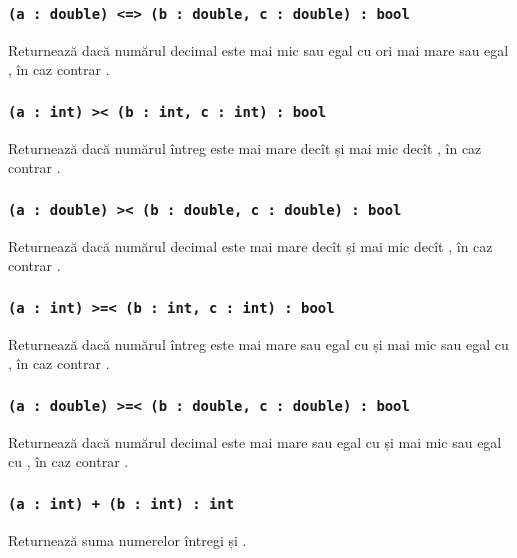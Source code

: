 \subsubsection{\lstinline|(a : double) <=> (b : double, c : double) : bool|}

Returnează \true{} dacă numărul decimal  este mai mic sau egal cu  ori mai mare sau egal , în caz contrar \false{}.

\subsubsection{\lstinline|(a : int) >< (b : int, c : int) : bool|}

Returnează \true{} dacă numărul întreg  este mai mare decît  și mai mic decît , în caz contrar \false{}.

\subsubsection{\lstinline|(a : double) >< (b : double, c : double) : bool|}

Returnează \true{} dacă numărul decimal  este mai mare decît  și mai mic decît , în caz contrar \false{}.

\subsubsection{\lstinline|(a : int) >=< (b : int, c : int) : bool|}

Returnează \true{} dacă numărul întreg  este mai mare sau egal cu  și mai mic sau egal cu , în caz contrar \false{}.

\subsubsection{\lstinline|(a : double) >=< (b : double, c : double) : bool|}

Returnează \true{} dacă numărul decimal  este mai mare sau egal cu  și mai mic sau egal cu , în caz contrar \false{}.

\subsubsection{\lstinline|(a : int) + (b : int) : int|}

Returnează suma numerelor întregi  și .

